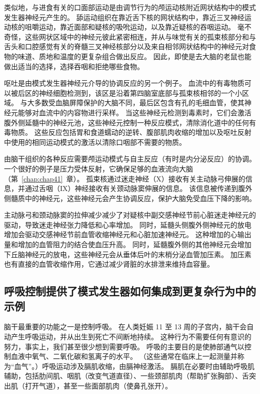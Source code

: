 类似地，与进食有关的口面部运动是由调节行为的颅运动核附近网状结构中的模式发生器神经元产生的。
舔运动组织在靠近舌下核的网状结构中，靠近三叉神经运动核的咀嚼运动，靠近面部和疑核的吸吮运动，以及靠近疑核的吞咽运动。
毫不奇怪，这些网状区域中的神经元彼此紧密相连，并从与味觉有关的孤束核部分和与舌头和口腔感觉有关的脊髓三叉神经核部分以及来自相邻网状结构中的神经元对食物的味道、质地和温度的更复杂组合做出反应。
因此，即使是去大脑的老鼠也能做出适当的选择，选择吞咽和拒绝哪些食物。


呕吐是由模式发生器神经元介导的协调反应的另一个例子。
血流中的有毒物质可以被后区的神经细胞检测到，该区是沿着第四脑室底部与孤束核相邻的一个小区域。
与大多数受血脑屏障保护的大脑不同，最后区包含有孔的毛细血管，使其神经元能够对血流中的内容物进行采样。
当这些神经元检测到毒素时，它们会激活腹外侧延髓中的神经元池，这些神经元控制一种反应模式，清除消化道中的任何有毒物质。
这些反应包括胃和食道蠕动的逆转、腹部肌肉收缩的增加以及呕吐反射中使用的相同运动模式的激活以清除口咽部不需要的物质。


由脑干组织的各种反应需要颅运动模式与自主反应（有时是内分泌反应）的协调。
一个很好的例子是压力受体反射，它确保足够的血液流向大脑（第~\ref{chap:chap41}~章）。
孤束核通过迷走神经（X）接收有关主动脉弓伸展的信息，并通过舌咽（IX）神经接收有关颈动脉窦伸展的信息。
该信息被传递到腹外侧髓质中的神经元，这些神经元会产生协调反应，保护大脑免受血压下降的影响。


主动脉弓和颈动脉窦的拉伸减少减少了对疑核中副交感神经节前心脏迷走神经元的驱动，导致迷走神经张力降低和心率增加。
同时，延髓头侧腹外侧神经元的放电增加会驱动交感神经节前血管收缩神经元和心脏加速神经元。
这种增加的心输出量和增加的血管阻力的结合使血压升高。
同时，延髓腹外侧的其他神经元会增加下丘脑神经元的放电，这些神经元会从垂体后叶的末梢分泌血管加压素。
加压素也有直接的血管收缩作用，它通过减少肾脏的水排泄来维持血容量。



\subsection{呼吸控制提供了模式发生器如何集成到更复杂行为中的示例}

脑干最重要的功能之一是控制呼吸。
在人类妊娠 11 至 13 周的子宫内，脑干会自动产生呼吸运动，并从出生到死亡不间断地持续。
这种行为不需要任何有意识的努力，事实上，我们甚至很少想到需要呼吸。
呼吸的主要目的是使肺部通气以控制血液中氧气、二氧化碳和氢离子的水平。
（这些通常在临床上一起测量并称为“血气”。）呼吸运动涉及膈肌收缩，由膈神经激活。
膈肌在必要时由辅助呼吸肌辅助，包括肋间肌、咽肌（改变气道直径）、一些颈部肌肉（帮助扩张胸部）、舌突出肌（打开气道），甚至一些面部肌肉（使鼻孔张开）。


